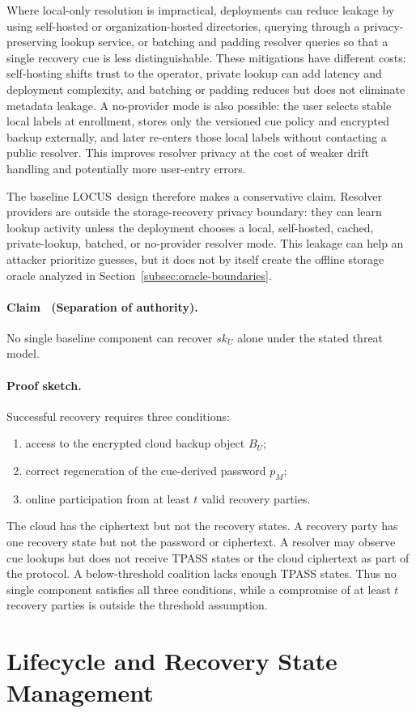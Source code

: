 \documentclass[sigconf,anonymous]{acmart}
\newcounter{protocol}
\newcommand{\LOCUS}{\textsf{LOCUS}}
\newcounter{locusclaim}
\newcommand{\locusclaim}[1]{\refstepcounter{locusclaim}\paragraph{Claim \thelocusclaim\ (#1).}}
\newcommand{\proofsketch}{\paragraph{Proof sketch.}}
\begin{document}
Where local-only resolution is impractical, deployments can reduce leakage by using self-hosted or organization-hosted directories, querying through a privacy-preserving lookup service, or batching and padding resolver queries so that a single recovery cue is less distinguishable. These mitigations have different costs: self-hosting shifts trust to the operator, private lookup can add latency and deployment complexity, and batching or padding reduces but does not eliminate metadata leakage. A no-provider mode is also possible: the user selects stable local labels at enrollment, stores only the versioned cue policy and encrypted backup externally, and later re-enters those local labels without contacting a public resolver. This improves resolver privacy at the cost of weaker drift handling and potentially more user-entry errors.

The baseline \LOCUS\ design therefore makes a conservative claim. Resolver providers are outside the storage-recovery privacy boundary: they can learn lookup activity unless the deployment chooses a local, self-hosted, cached, private-lookup, batched, or no-provider resolver mode. This leakage can help an attacker prioritize guesses, but it does not by itself create the offline storage oracle analyzed in Section~\ref{subsec:oracle-boundaries}.

\locusclaim{Separation of authority}
\label{claim:authority}
No single baseline component can recover \(sk_U\) alone under the stated threat model.

\proofsketch
Successful recovery requires three conditions:
\begin{enumerate}
    \item access to the encrypted cloud backup object \(B_U\);
    \item correct regeneration of the cue-derived password \(p_M\);
    \item online participation from at least \(t\) valid recovery parties.
\end{enumerate}
The cloud has the ciphertext but not the recovery states. A recovery party has one recovery state but not the password or ciphertext. A resolver may observe cue lookups but does not receive TPASS states or the cloud ciphertext as part of the protocol. A below-threshold coalition lacks enough TPASS states. Thus no single component satisfies all three conditions, while a compromise of at least \(t\) recovery parties is outside the threshold assumption.

\section{Lifecycle and Recovery State Management}
\label{sec:lifecycle}
\end{document}
